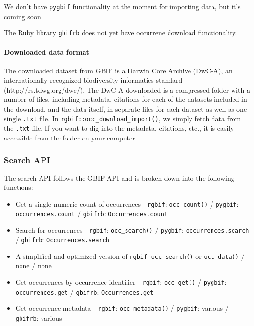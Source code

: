 \documentclass[author-year, review, 11pt]{components/elsarticle} %
\def\tightlist{}
\begin{document}
We don't have \texttt{pygbif} functionality at the moment for importing
data, but it's coming soon.

The Ruby library \texttt{gbifrb} does not yet have occurrene download
functionality.

\paragraph{Downloaded data format}\label{downloaded-data-format}

The downloaded dataset from GBIF is a Darwin Core Archive (DwC-A), an
internationally recognized biodiversity informatics standard
(\url{http://rs.tdwg.org/dwc/}). The DwC-A downloaded is a compressed
folder with a number of files, including metadata, citations for each of
the datasets included in the download, and the data itself, in separate
files for each dataset as well as one single \texttt{.txt} file. In
\texttt{rgbif::occ\_download\_import()}, we simply fetch data from the
\texttt{.txt} file. If you want to dig into the metadata, citations,
etc., it is easily accessible from the folder on your computer.

\subsubsection{Search API}\label{search-api}

The search API follows the GBIF API and is broken down into the
following functions:

\begin{itemize}
\tightlist
\item
  Get a single numeric count of occurrences - \texttt{rgbif}:
  \texttt{occ\_count()} / \texttt{pygbif}: \texttt{occurrences.count} /
  \texttt{gbifrb}: \texttt{Occurrences.count}
\item
  Search for occurrences - \texttt{rgbif}: \texttt{occ\_search()} /
  \texttt{pygbif}: \texttt{occurrences.search} / \texttt{gbifrb}:
  \texttt{Occurrences.search}
\item
  A simplified and optimized version of \texttt{rgbif}:
  \texttt{occ\_search()} or \texttt{occ\_data()} / none / none
\item
  Get occurrences by occurrence identifier - \texttt{rgbif}:
  \texttt{occ\_get()} / \texttt{pygbif}: \texttt{occurrences.get} /
  \texttt{gbifrb}: \texttt{Occurrences.get}
\item
  Get occurrence metadata - \texttt{rgbif}: \texttt{occ\_metadata()} /
  \texttt{pygbif}: various / \texttt{gbifrb}: various
\end{itemize}
\end{document}
